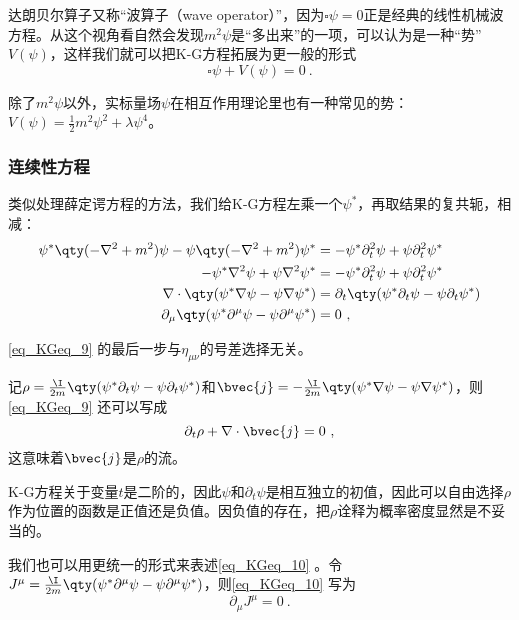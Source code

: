 达朗贝尔算子又称“波算子（wave operator）”，因为$\square \psi=0$正是经典的线性机械波方程。从这个视角看自然会发现$m^2\psi$是“多出来”的一项，可以认为是一种“势”$V(\psi)$，这样我们就可以把K-G方程拓展为更一般的形式
\begin{equation}
\square\psi + V(\psi) = 0~.
\end{equation}

除了$m^2\psi$以外，实标量场$\psi$在相互作用理论里也有一种常见的势：$V(\psi)=\frac{1}{2}m^2\psi^2+\lambda\psi^4$。





\subsubsection{连续性方程}

类似处理薛定谔方程的方法，我们给K-G方程左乘一个$\psi^*$，再取结果的复共轭，相减：
\begin{equation}\label{eq_KGeq_9}
\begin{aligned}
\psi^*\qty(-\nabla^2+m^2)\psi-\psi\qty(-\nabla^2+m^2)\psi^* &= -\psi^*\partial_t^2 \psi+\psi\partial_t^2 \psi^*\\
-\psi^*\nabla^2\psi+\psi\nabla^2\psi^* &= -\psi^*\partial_t^2\psi+\psi\partial_t^2\psi^*\\
\nabla\cdot\qty(\psi^*\nabla\psi-\psi\nabla\psi^*) &= \partial_t\qty(\psi^*\partial_t\psi-\psi\partial_t\psi^*)\\
\partial_\mu\qty(\psi^*\partial^\mu\psi-\psi\partial^\mu\psi^*) & =0~,
\end{aligned}
\end{equation}

\autoref{eq_KGeq_9} 的最后一步与$\eta_{\mu\nu}$的号差选择无关。

记$\rho=\frac{\I}{2m}\qty(\psi^*\partial_t\psi-\psi\partial_t\psi^*)$和$\bvec{j}=-\frac{\I}{2m}\qty(\psi^*\nabla\psi-\psi\nabla\psi^*)$，则\autoref{eq_KGeq_9} 还可以写成
\begin{equation}\label{eq_KGeq_10}
\partial_t\rho+\nabla\cdot\bvec{j} = 0~,
\end{equation}
这意味着$\bvec{j}$是$\rho$的流。

K-G方程关于变量$t$是二阶的，因此$\psi$和$\partial_t\psi$是相互独立的初值，因此可以自由选择$\rho$作为位置的函数是正值还是负值。因负值的存在，把$\rho$诠释为概率密度显然是不妥当的。

我们也可以用更统一的形式来表述\autoref{eq_KGeq_10} 。令$J^\mu=\frac{\I}{2m}\qty(\psi^*\partial^\mu\psi-\psi\partial^\mu\psi^*)$，则\autoref{eq_KGeq_10} 写为
\begin{equation}
\partial_\mu J^\mu = 0~.
\end{equation}




